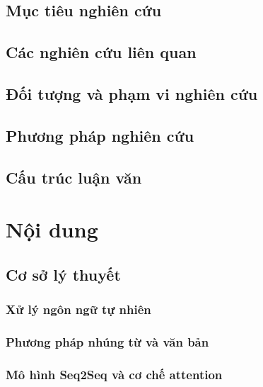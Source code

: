 \documentclass[a4paper, 12pt, openany]{book}
\begin{document}
\section{Mục tiêu nghiên cứu}

\section{Các nghiên cứu liên quan}

\section{Đối tượng và phạm vi nghiên cứu}

\section{Phương pháp nghiên cứu}

\section{Cấu trúc luận văn}


\chapter{Nội dung}

\section{Cơ sở lý thuyết}
\subsection{Xử lý ngôn ngữ tự nhiên}

\subsection{Phương pháp nhúng từ và văn bản}

\subsection{Mô hình Seq2Seq và cơ chế attention}
\end{document}
